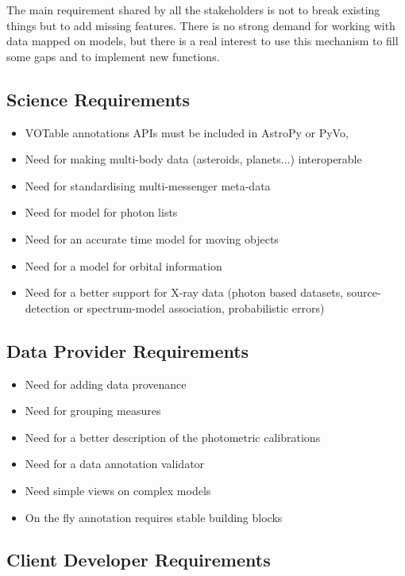 \documentclass[11pt,a4paper]{ivoa}
\begin{document}
The main requirement shared by all the stakeholders is not to break existing things but to add missing features.
There is no strong demand for working with data mapped on models, but there is a real interest to use this mechanism 
to fill some gaps and to implement new functions.

\subsection{Science Requirements}

\begin{itemize}
\item VOTable annotations APIs must be included in AstroPy or PyVo,
\item Need for making multi-body data (asteroids, planets...) interoperable
\item Need for standardising multi-messenger meta-data
\item Need for model for photon lists
\item Need for an accurate time model for moving objects
\item Need for a model for orbital information
\item Need for a better support for X-ray data (photon based datasets, source-detection or spectrum-model association, probabilistic errors)
\end{itemize}

\subsection{Data Provider Requirements}

\begin{itemize}
\item Need for adding data provenance
\item Need for grouping measures
\item Need for a better description of the photometric calibrations
\item Need for a data annotation validator
\item Need simple views on complex models
\item On the fly annotation requires stable building blocks
\end{itemize}

\subsection{Client Developer Requirements}
\end{document}
